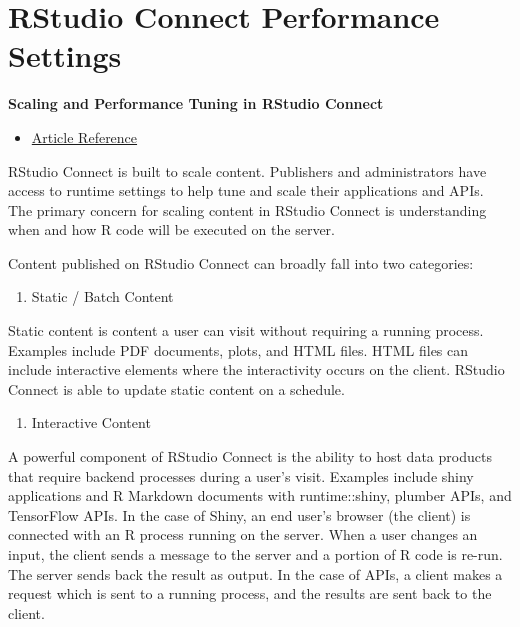 \documentclass[]{book}
\providecommand{\tightlist}{%
  \setlength{\itemsep}{0pt}\setlength{\parskip}{0pt}}
\theoremstyle{definition}
\theoremstyle{definition}
\theoremstyle{definition}
\theoremstyle{remark}
\begin{document}
\hypertarget{rstudio-connect-performance-settings}{%
\section{RStudio Connect Performance
Settings}\label{rstudio-connect-performance-settings}}

\textbf{Scaling and Performance Tuning in RStudio Connect}

\begin{itemize}
\tightlist
\item
  \href{https://support.rstudio.com/hc/en-us/articles/231874748-scaling-and-performance-tuning-rstudio-connect}{Article
  Reference}
\end{itemize}

RStudio Connect is built to scale content. Publishers and administrators
have access to runtime settings to help tune and scale their
applications and APIs. The primary concern for scaling content in
RStudio Connect is understanding when and how R code will be executed on
the server.

Content published on RStudio Connect can broadly fall into two
categories:

\begin{enumerate}
\def\labelenumi{\arabic{enumi}.}
\tightlist
\item
  Static / Batch Content
\end{enumerate}

Static content is content a user can visit without requiring a running
process. Examples include PDF documents, plots, and HTML files. HTML
files can include interactive elements where the interactivity occurs on
the client. RStudio Connect is able to update static content on a
schedule.

\begin{enumerate}
\def\labelenumi{\arabic{enumi}.}
\setcounter{enumi}{1}
\tightlist
\item
  Interactive Content
\end{enumerate}

A powerful component of RStudio Connect is the ability to host data
products that require backend processes during a user's visit. Examples
include shiny applications and R Markdown documents with runtime::shiny,
plumber APIs, and TensorFlow APIs. In the case of Shiny, an end user's
browser (the client) is connected with an R process running on the
server. When a user changes an input, the client sends a message to the
server and a portion of R code is re-run. The server sends back the
result as output. In the case of APIs, a client makes a request which is
sent to a running process, and the results are sent back to the client.
\end{document}

